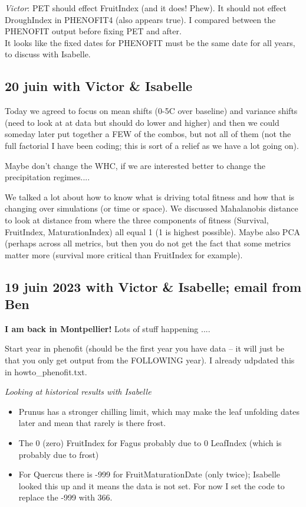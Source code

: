 \documentclass[11pt,letter]{article}
\begin{document}
\emph{Victor}:
PET should effect FruitIndex (and it does! Phew). It should not effect DroughIndex in PHENOFIT4 (also appears true). I compared between the PHENOFIT output before fixing PET and after. \\
It looks like the fixed dates for PHENOFIT must be the same date for all years, to discuss with Isabelle.\\

\subsection{20 juin with Victor \& Isabelle}

Today we agreed to focus on mean shifts (0-5C over baseline) and variance shifts (need to look at at data but should do lower and higher) and then we could someday later put together a FEW of the combos, but not all of them (not the full factorial I have been coding; this is sort of a relief as we have a lot going on). 

Maybe don't change the WHC, if we are interested better to change the precipitation regimes.... 

We talked a lot about how to know what is driving total fitness and how that is changing over simulations (or time or space). We discussed Mahalanobis distance to look at distance from where the three components of fitness (Survival, FruitIndex, MaturationIndex) all equal 1 (1 is highest possible). Maybe also PCA (perhaps across all metrics, but then you do not get the fact that some metrics matter more (survival more critical than FruitIndex for example). 

\subsection{19 juin 2023 with Victor \& Isabelle; email from Ben}

{\bf I am back in Montpellier!} Lots of stuff happening ....

Start year in phenofit (should be the first year you have data -- it will just be that you only get output from the FOLLOWING year). I already udpdated this in howto\_phenofit.txt.

\emph{Looking at historical results with Isabelle}
\begin{itemize}
\item Prunus has a stronger chilling limit, which may make the leaf unfolding dates later and mean that rarely is there frost.
\item The 0 (zero) FruitIndex for Fagus probably due to 0 LeafIndex (which is probably due to frost)
\item For Quercus there is -999 for FruitMaturationDate (only twice); Isabelle looked this up and it means the data is not set. For now I set the code to replace the -999 with 366. 
\end{itemize}
\end{document}
